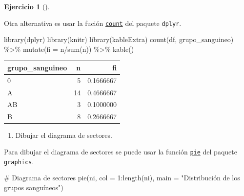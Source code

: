 \documentclass[
  a4paper,
]{scrreport}
\newenvironment{Shaded}{\begin{snugshade}}{\end{snugshade}}
\newcommand{\AttributeTok}[1]{\textcolor[rgb]{0.40,0.45,0.13}{#1}}
\newcommand{\CommentTok}[1]{\textcolor[rgb]{0.37,0.37,0.37}{#1}}
\newcommand{\DecValTok}[1]{\textcolor[rgb]{0.68,0.00,0.00}{#1}}
\newcommand{\FunctionTok}[1]{\textcolor[rgb]{0.28,0.35,0.67}{#1}}
\newcommand{\NormalTok}[1]{\textcolor[rgb]{0.00,0.23,0.31}{#1}}
\newcommand{\SpecialCharTok}[1]{\textcolor[rgb]{0.37,0.37,0.37}{#1}}
\newcommand{\StringTok}[1]{\textcolor[rgb]{0.13,0.47,0.30}{#1}}
\providecommand{\tightlist}{%
  \setlength{\itemsep}{0pt}\setlength{\parskip}{0pt}}\usepackage{longtable,booktabs,array}
\theoremstyle{definition}
\newtheorem{exercise}{Ejercicio}[chapter]
\theoremstyle{remark}
\begin{document}
\begin{exercise}[]
\begin{tcolorbox}
Otra alternativa es usar la fución
\href{https://aprendeconalf.es/manual-r/06-preprocesamiento.html\#conteo-del-n\%C3\%BAmero-de-observaciones}{\texttt{count}}
del paquete \texttt{dplyr}.

\begin{Shaded}
\begin{Highlighting}[]
\FunctionTok{library}\NormalTok{(dplyr)}
\FunctionTok{library}\NormalTok{(knitr)}
\FunctionTok{library}\NormalTok{(kableExtra)}
\FunctionTok{count}\NormalTok{(df, grupo\_sanguineo) }\SpecialCharTok{\%\textgreater{}\%} 
    \FunctionTok{mutate}\NormalTok{(}\AttributeTok{fi =}\NormalTok{ n}\SpecialCharTok{/}\FunctionTok{sum}\NormalTok{(n)) }\SpecialCharTok{\%\textgreater{}\%}
    \FunctionTok{kable}\NormalTok{()}
\end{Highlighting}
\end{Shaded}

\begin{tabular}{l|r|r}
\hline
grupo\_sanguineo & n & fi\\
\hline
0 & 5 & 0.1666667\\
\hline
A & 14 & 0.4666667\\
\hline
AB & 3 & 0.1000000\\
\hline
B & 8 & 0.2666667\\
\hline
\end{tabular}

\end{tcolorbox}

\begin{enumerate}
\def\labelenumi{\alph{enumi}.}
\setcounter{enumi}{2}
\tightlist
\item
  Dibujar el diagrama de sectores.
\end{enumerate}

\begin{tcolorbox}[enhanced jigsaw, coltitle=black, breakable, bottomtitle=1mm, colbacktitle=quarto-callout-tip-color!10!white, rightrule=.15mm, opacityback=0, opacitybacktitle=0.6, left=2mm, colframe=quarto-callout-tip-color-frame, title=\textcolor{quarto-callout-tip-color}{\faLightbulb}\hspace{0.5em}{Solución 1}, toprule=.15mm, toptitle=1mm, arc=.35mm, colback=white, titlerule=0mm, bottomrule=.15mm, leftrule=.75mm]

Para dibujar el diagrama de sectores se puede usar la función
\href{https://www.rdocumentation.org/packages/graphics/versions/3.6.2/topics/pie}{\texttt{pie}}
del paquete \texttt{graphics}.

\begin{Shaded}
\begin{Highlighting}[]
\CommentTok{\# Diagrama de sectores}
\FunctionTok{pie}\NormalTok{(ni, }\AttributeTok{col =} \DecValTok{1}\SpecialCharTok{:}\FunctionTok{length}\NormalTok{(ni), }\AttributeTok{main =} \StringTok{"Distribución de los grupos sanguíneos"}\NormalTok{)}
\end{Highlighting}
\end{Shaded}


\end{tcolorbox}
\end{exercise}
\end{document}
